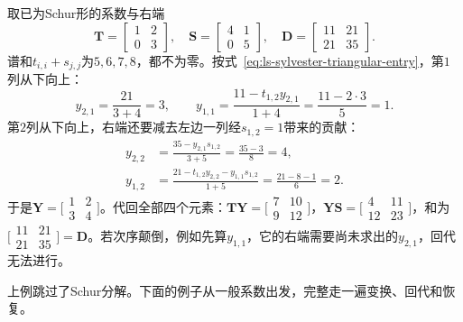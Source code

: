 \begin{example}[Schur形方程的逐元素回代]
\label{ex:ls-sylvester-schur-form-entries}
取已为Schur形的系数与右端
\[
 \bm T=\begin{bmatrix}1&2\\0&3\end{bmatrix},\quad
 \bm S=\begin{bmatrix}4&1\\0&5\end{bmatrix},\quad
 \bm D=\begin{bmatrix}11&21\\21&35\end{bmatrix}.
\]
谱和$t_{i,i}+s_{j,j}$为$5,6,7,8$，都不为零。按式~\eqref{eq:ls-sylvester-triangular-entry}，第$1$列从下向上：
\[
 y_{2,1}=\frac{21}{3+4}=3,\qquad
 y_{1,1}=\frac{11-t_{1,2}y_{2,1}}{1+4}=\frac{11-2\cdot3}{5}=1 .
\]
第$2$列从下向上，右端还要减去左边一列经$s_{1,2}=1$带来的贡献：
\[
 \begin{aligned}
 y_{2,2}&=\frac{35-y_{2,1}s_{1,2}}{3+5}=\frac{35-3}{8}=4,\\
 y_{1,2}&=\frac{21-t_{1,2}y_{2,2}-y_{1,1}s_{1,2}}{1+5}=\frac{21-8-1}{6}=2 .
 \end{aligned}
\]
于是$\bm Y=\bigl[\begin{smallmatrix}1&2\\3&4\end{smallmatrix}\bigr]$。代回全部四个元素：$\bm T\bm Y=\bigl[\begin{smallmatrix}7&10\\9&12\end{smallmatrix}\bigr]$，$\bm Y\bm S=\bigl[\begin{smallmatrix}4&11\\12&23\end{smallmatrix}\bigr]$，和为$\bigl[\begin{smallmatrix}11&21\\21&35\end{smallmatrix}\bigr]=\bm D$。若次序颠倒，例如先算$y_{1,1}$，它的右端需要尚未求出的$y_{2,1}$，回代无法进行。
\end{example}

上例跳过了Schur分解。下面的例子从一般系数出发，完整走一遍变换、回代和恢复。

